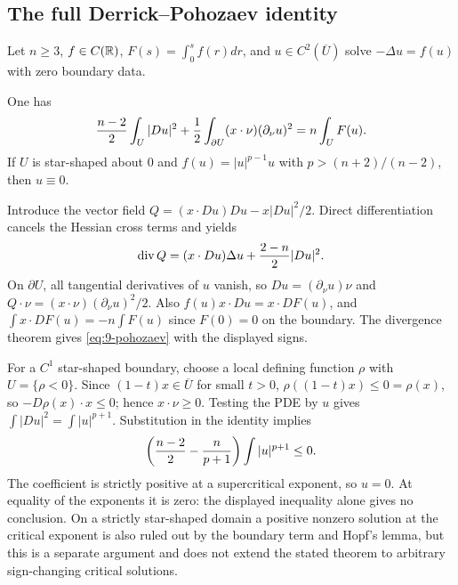 \subsection{The full Derrick--Pohozaev identity}
Let $n\geq3$, $f\in C(\mathbb{R})$, $F(s)=\int_0^sf(r)dr$, and
$u\in C^2(\overline U)$ solve $-\Delta u=f(u)$ with zero boundary data.
\Needspace{50mm}
\begin{theorem}
One has
\begin{equation}\label{eq:9-pohozaev}
 {n-2\over2}\int_U|Du|^2
 +{1\over2}\int_{\partial U}(x\cdot\nu)(\partial_\nu u)^2
 =n\int_U F(u).
\end{equation}
If $U$ is star-shaped about $0$ and $f(u)=|u|^{p-1}u$ with
$p>(n+2)/(n-2)$, then $u\equiv0$.
\end{theorem}
\begin{expandedproof}
Introduce the vector field
$Q=(x\cdot Du)Du-x|Du|^2/2$. Direct differentiation cancels the Hessian
cross terms and yields
\[
 \operatorname{div}Q=(x\cdot Du)\Delta u+{2-n\over2}|Du|^2.
\]
On $\partial U$, all tangential derivatives of $u$ vanish, so
$Du=(\partial_\nu u)\nu$ and
$Q\cdot\nu=(x\cdot\nu)(\partial_\nu u)^2/2$.
Also $f(u)x\cdot Du=x\cdot DF(u)$, and
$\int x\cdot DF(u)=-n\int F(u)$ since $F(0)=0$ on the boundary.
The divergence theorem gives \eqref{eq:9-pohozaev} with the displayed signs.

For a $C^1$ star-shaped boundary, choose a local defining function
$\rho$ with $U=\{\rho<0\}$. Since $(1-t)x\in\overline U$ for small
$t>0$, $\rho((1-t)x)\leq0=\rho(x)$, so
$-D\rho(x)\cdot x\leq0$; hence $x\cdot\nu\geq0$.
Testing the PDE by $u$ gives
$\int|Du|^2=\int|u|^{p+1}$. Substitution in the identity implies
\[
 \left({n-2\over2}-{n\over p+1}\right)\int|u|^{p+1}\leq0.
\]
The coefficient is strictly positive at a supercritical exponent, so
$u=0$. At equality of the exponents it is zero: the displayed inequality
alone gives no conclusion. On a strictly star-shaped domain a positive
nonzero solution at the critical exponent is also ruled out by the
boundary term and Hopf's lemma, but this is a separate argument and does
not extend the stated theorem to arbitrary sign-changing critical solutions.
\end{expandedproof}
\Needspace{42mm}
